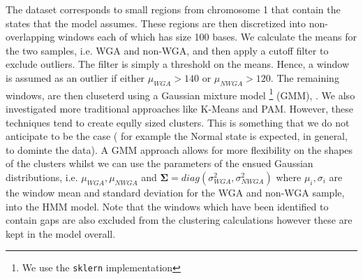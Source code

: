 The dataset corresponds to small regions from chromosome 1 that contain the states that the model assumes. These regions are then discretized into non-overlapping windows each of which has size 100 bases.  We calculate the means for the two samples, i.e. WGA and non-WGA, and then apply a cutoff filter to exclude outliers. The filter is simply a threshold on the means. Hence, a window is assumed as an outlier if either $\mu_{WGA} > 140$ or $\mu_{NWGA} > 120$.  The remaining windows, are then cluseterd using a Gaussian mixture model \footnote{We use the \texttt{sklern} implementation} (GMM), \cite{flach2012}.  We also investigated more traditional approaches like K-Means and PAM. However, these techniques tend to create eqully sized clusters. This is something  that we do not anticipate to be the case ( for example the Normal state is expected, in general, to dominte the data). A GMM approach allows for more flexibility on the shapes of the clusters whilst we can use the parameters of the ensued Gaussian distributions, i.e. $\mu_{WGA}, \mu_{NWGA}$ and   $\boldsymbol{\Sigma} = diag(\sigma_{WGA}^2, \sigma_{NWGA}^2)$ where $\mu_{i}, \sigma_{i}$ are the window mean and standard  deviation for the WGA and non-WGA sample,  into the HMM model. Note that the windows which have been identified to contain gaps are also excluded from the clustering calculations however these are kept in the model overall.  


 
